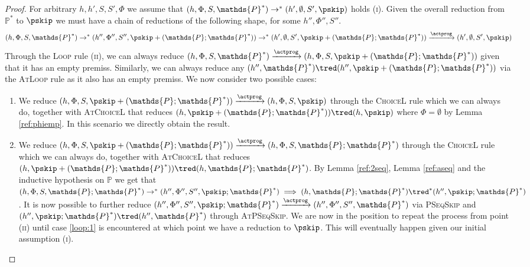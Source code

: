 {\begin{proof}
For arbitrary $h, h', S, S', \Phi$ we assume that $(h, \Phi, S, \mathds{P}^*) \rightarrow^* (h', \emptyset, S', \pskip)$ holds (\textsc{i}). Given the overall reduction from $\mathds{P}^*$ to $\pskip$ we must have a chain of reductions of the following shape, for some $h'', \Phi'', S''$.
\[
(h, \Phi, S, \mathds{P}^*) \rightarrow^* (h'', \Phi'', S'', \pskip + (\mathds{P} ; \mathds{P}^*)) \rightarrow^*  (h', \emptyset, S', \pskip + (\mathds{P} ; \mathds{P}^*)) \xrightarrow{\actprog} (h', \emptyset, S', \pskip)
\]
Through the \textsc{Loop} rule (\textsc{ii}), we can always reduce $(h, \Phi, S, \mathds{P}^*) \xrightarrow{\actprog} (h, \Phi, S, \pskip + (\mathds{P} ; \mathds{P}^*))$ given that it has an empty premiss. Similarly, we can always reduce any $(h'', \mathds{P}^*) \tred (h'', \pskip + (\mathds{P} ; \mathds{P}^*))$ via the \textsc{AtLoop} rule as it also has an empty premiss. We now consider two possible cases:
\begin{enumerate}
\item \label{loop:1} We reduce $(h, \Phi, S, \pskip + (\mathds{P} ; \mathds{P}^*)) \xrightarrow{\actprog} (h, \Phi, S, \pskip)$ through the \textsc{ChoiceL} rule which we can always do, together with \textsc{AtChoiceL} that reduces $(h, \pskip + (\mathds{P} ; \mathds{P}^*)) \tred (h, \pskip)$ where $\Phi = \emptyset$ by Lemma \ref{ref:phiemp}. In this scenario we directly obtain the result.
\item We reduce $(h, \Phi, S, \pskip + (\mathds{P} ; \mathds{P}^*)) \xrightarrow{\actprog} (h, \Phi, S, \mathds{P} ; \mathds{P}^*)$ through the \textsc{ChoiceL} rule which we can always do, together with \textsc{AtChoiceL} that reduces $(h, \pskip + (\mathds{P} ; \mathds{P}^*)) \tred (h, \mathds{P} ; \mathds{P}^*)$. By Lemma \ref{ref:2seq}, Lemma \ref{ref:aseq} and the inductive hypothesis on $\mathds{P}$ we get that $(h, \Phi, S, \mathds{P} ; \mathds{P}^*) \rightarrow^* (h'', \Phi'', S'', \pskip ; \mathds{P}^*) \implies (h, \mathds{P} ; \mathds{P}^*) \tred^* (h'', \pskip ; \mathds{P}^*)$. It is now possible to further reduce $(h'', \Phi'', S'', \pskip ; \mathds{P}^*) \xrightarrow{\actprog} (h'', \Phi'', S'', \mathds{P}^*)$ via \textsc{PSeqSkip} and $(h'', \pskip ; \mathds{P}^*) \tred (h'', \mathds{P}^*)$ through \textsc{AtPSeqSkip}. We are now in the position to repeat the process from point (\textsc{ii}) until case \ref{loop:1} is encountered at which point we have a reduction to $\pskip$. This will eventually happen given our initial assumption (\textsc{i}). \\
\end{enumerate}


\end{proof}}
